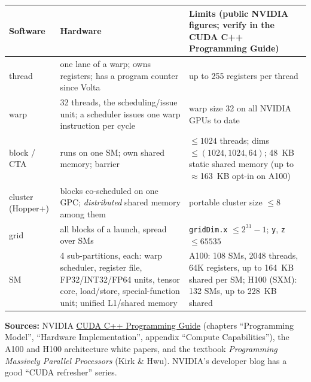 \documentclass[10pt,a4paper,openany,oneside]{report}
\newcommand{\src}[2]{\href{#1}{\textcolor{srcorange}{\underline{#2}}}}   %
\begin{document}
\begin{center}\small
\begin{xltabular}{\textwidth}{@{}L{2.5cm}L{5.6cm}Y@{}}
\toprule
\textbf{Software} & \textbf{Hardware} & \textbf{Limits (public NVIDIA figures; verify in the CUDA C++ Programming Guide)}\\
\midrule\endhead
thread & one lane of a warp; owns registers; has a program counter since Volta & up to 255 registers per thread\\
warp & 32 threads, the scheduling/issue unit; a scheduler issues one warp instruction per cycle & warp size 32 on all NVIDIA GPUs to date\\
block / CTA & runs on one SM; own shared memory; barrier & $\le 1024$ threads; dims $\le(1024,1024,64)$; 48~KB static shared memory (up to $\approx$163~KB opt-in on A100)\\
cluster (Hopper+) & blocks co-scheduled on one GPC; \emph{distributed} shared memory among them & portable cluster size $\le 8$\\
grid & all blocks of a launch, spread over SMs & \texttt{gridDim.x} $\le 2^{31}-1$; \texttt{y}, \texttt{z} $\le 65535$\\
SM & 4 sub-partitions, each: warp scheduler, register file, FP32/INT32/FP64 units, tensor core, load/store, special-function unit; unified L1/shared memory & A100: 108 SMs, 2048 threads, 64K registers, up to 164~KB shared per SM; H100 (SXM): 132 SMs, up to 228~KB shared\\
\bottomrule
\end{xltabular}
\end{center}
\textbf{Sources:} NVIDIA \src{https://docs.nvidia.com/cuda/cuda-c-programming-guide/}{CUDA C++ Programming Guide} (chapters ``Programming Model'', ``Hardware Implementation'', appendix ``Compute Capabilities''), the A100 and H100 architecture white papers, and the textbook \emph{Programming Massively Parallel Processors} (Kirk \& Hwu). NVIDIA's developer blog has a good ``CUDA refresher'' series.
\end{document}
